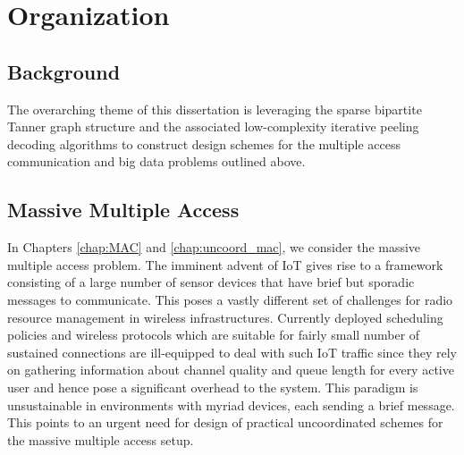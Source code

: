 \section{Organization}
\subsection*{Background}
The overarching theme of this dissertation is leveraging the sparse bipartite Tanner graph structure and the associated low-complexity iterative peeling decoding algorithms to construct design schemes for the multiple access communication and big data problems outlined above. %


\subsection*{Massive Multiple Access}
In Chapters \ref{chap:MAC} and \ref{chap:uncoord_mac}, we consider the massive multiple access problem.  The imminent advent of IoT gives rise to a framework consisting of a large number of sensor devices that have brief but sporadic messages to communicate. This poses a vastly different set of challenges for radio resource management in wireless infrastructures. Currently deployed scheduling policies and wireless protocols which are suitable for fairly small number of sustained connections are ill-equipped to deal with such IoT traffic since they rely on gathering information about channel quality and queue length for every active user and hence pose a significant overhead to the system. This paradigm is unsustainable in environments with myriad devices, each sending a brief message.  This points to an urgent need for design of practical uncoordinated schemes for the massive multiple access setup. 

